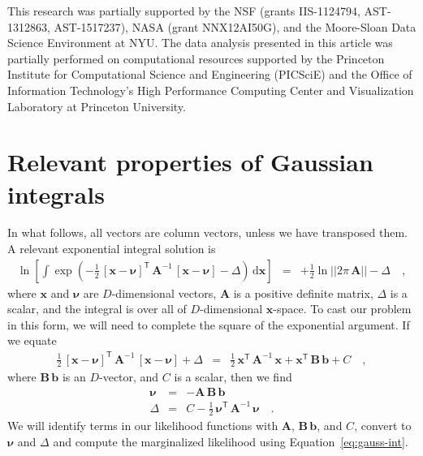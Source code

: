 \documentclass[manuscript, letterpaper]{aastex6}
\newcommand{\project}[1]{\textsl{#1}}
\newcommand{\acronym}[1]{{\small{#1}}}
\newcommand{\apogee}{\project{\acronym{APOGEE}}}
\newcommand{\eqname}{Equation}
\newcommand{\dd}{\mathrm{d}}
\newcommand{\transp}[1]{{#1}^{\!\mathsf{T}}}
\newcommand{\inv}[1]{{#1}^{-1}}
\newcommand{\bs}[1]{\boldsymbol{#1}}
\newcommand{\mat}[1]{\mathbf{#1}}
\renewcommand{\vec}[1]{\bs{#1}}
\begin{document}
This research was partially supported by the \acronym{NSF} (grants
  \acronym{IIS-1124794}, \acronym{AST-1312863}, \acronym{AST-1517237}),
  \acronym{NASA} (grant \acronym{NNX12AI50G}),
  and the Moore-Sloan Data Science Environment at \acronym{NYU}. The data
analysis presented in this article was partially performed on computational
resources supported by the Princeton Institute for Computational Science and
Engineering (PICSciE) and the Office of Information Technology's High
Performance Computing Center and Visualization Laboratory at Princeton
University.







\appendix

\section{Relevant properties of Gaussian integrals}
\label{sec:appendixA}

In what follows, all vectors are column vectors, unless we have transposed them.
A relevant exponential integral solution is
\begin{eqnarray}
  \ln\left[\int\exp(-\frac{1}{2}\,
    \transp{[\vec{x}-\vec{\nu}]} \,
    \inv{\mat{A}} \,
    [\vec{x}-\vec{\nu}] - \Delta) \, \dd \vec{x}\right]
  &=& +\frac{1}{2}\ln ||2\pi\,\mat{A}|| -\Delta
  \quad , \label{eq:gauss-int}
\end{eqnarray}
where $\vec{x}$ and $\vec{\nu}$ are $D$-dimensional vectors, $\mat{A}$ is a
positive definite matrix, $\Delta$ is a scalar, and the integral is over all of
$D$-dimensional $\vec{x}$-space.
To cast our problem in this form, we will need to complete the square of the
exponential argument.
If we equate
\begin{eqnarray}
  \frac{1}{2}\,\transp{[\vec{x}-\vec{\nu}]}\,\inv{\mat{A}}\,[\vec{x}-\vec{\nu}] + \Delta
  &=& \frac{1}{2}\,\transp{\vec{x}}\,\inv{\mat{A}}\,\vec{x} + \transp{\vec{x}}\,\mat{B}\,\vec{b} + C
  \quad ,
\end{eqnarray}
where $\mat{B}\,\vec{b}$ is an $D$-vector, and $C$ is a scalar, then we find
\begin{eqnarray}
  \vec{\nu} &=& -\mat{A}\,\mat{B}\,\vec{b}
  \\
  \Delta & = & C - \frac{1}{2}\,\transp{\vec{\nu}}\,\inv{\mat{A}}\,\vec{\nu}
  \quad .
\end{eqnarray}
We will identify terms in our likelihood functions with $\mat{A}$,
$\mat{B}\,\vec{b}$, and $C$, convert to $\vec{\nu}$ and $\Delta$ and compute
the marginalized likelihood using \eqname~\ref{eq:gauss-int}.
\end{document}
